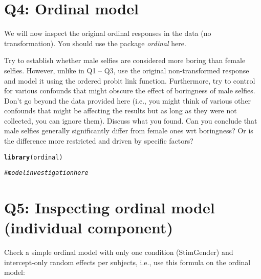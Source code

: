 \documentclass{article}\usepackage[]{graphicx}\usepackage[]{color}
\makeatletter
\newcommand{\hlcom}[1]{\textcolor[rgb]{0.678,0.584,0.686}{\textit{#1}}}%
\newcommand{\hlstd}[1]{\textcolor[rgb]{0.345,0.345,0.345}{#1}}%
\newcommand{\hlkwd}[1]{\textcolor[rgb]{0.737,0.353,0.396}{\textbf{#1}}}%
\newenvironment{kframe}{%
 \def\at@end@of@kframe{}%
 \ifinner\ifhmode%
  \def\at@end@of@kframe{\end{minipage}}%
  \begin{minipage}{\columnwidth}%
 \fi\fi%
 \def\FrameCommand##1{\hskip\@totalleftmargin \hskip-\fboxsep
 \colorbox{shadecolor}{##1}\hskip-\fboxsep
     \hskip-\linewidth \hskip-\@totalleftmargin \hskip\columnwidth}%
 \MakeFramed {\advance\hsize-\width
   \@totalleftmargin\z@ \linewidth\hsize
   \@setminipage}}%
 {\par\unskip\endMakeFramed%
 \at@end@of@kframe}
\newenvironment{knitrout}{}{} %
\makeatother
\begin{document}
\section*{Q4: Ordinal model}

We will now inspect the original ordinal responses in the data (no transformation). You should use the package \emph{ordinal} here.

Try to establish whether male selfies are considered more boring than female selfies. However, unlike in Q1 -- Q3, use the original non-transformed response and model it using the ordered probit link function. Furthermore, try to control for various confounds that might obscure the effect of boringness of male selfies. Don't go beyond the data provided here (i.e., you might think of various other confounds that might be affecting the results but as long as they were not collected, you can ignore them). Discuss what you found. Can you conclude that male selfies generally significantly differ from female ones wrt boringness? Or is the difference more restricted and driven by specific factors?

\begin{knitrout}
\color{fgcolor}\begin{kframe}
\begin{alltt}
\hlkwd{library}\hlstd{(ordinal)}
\end{alltt}


{\ttfamily\noindent\itshape\color{messagecolor}{\#\# \\\#\# Attaching package: 'ordinal'}}

{\ttfamily\noindent\itshape\color{messagecolor}{\#\# The following object is masked from 'package:dplyr':\\\#\# \\\#\#\ \ \ \  slice}}\begin{alltt}
\hlcom{# model investigation here}
\end{alltt}
\end{kframe}
\end{knitrout}

\section*{Q5: Inspecting ordinal model (individual component)}

Check a simple ordinal model with only one condition (StimGender) and intercept-only random effects per subjects, i.e., use this formula on the ordinal model:
\end{document}
